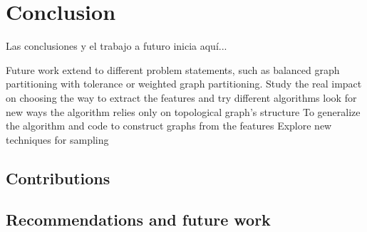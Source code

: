 
\chapter{Conclusion}

Las conclusiones y el trabajo a futuro inicia aqu\'i...

Future work
extend to different problem statements, such as balanced graph partitioning with tolerance or weighted graph partitioning.
Study the real impact on choosing the way to extract the features and try different algorithms
look for new ways the algorithm relies only on topological graph's structure
To generalize the algorithm and code to construct graphs from the features
Explore new techniques for sampling

\section{Contributions}

\section{Recommendations and future work}

\clearpage